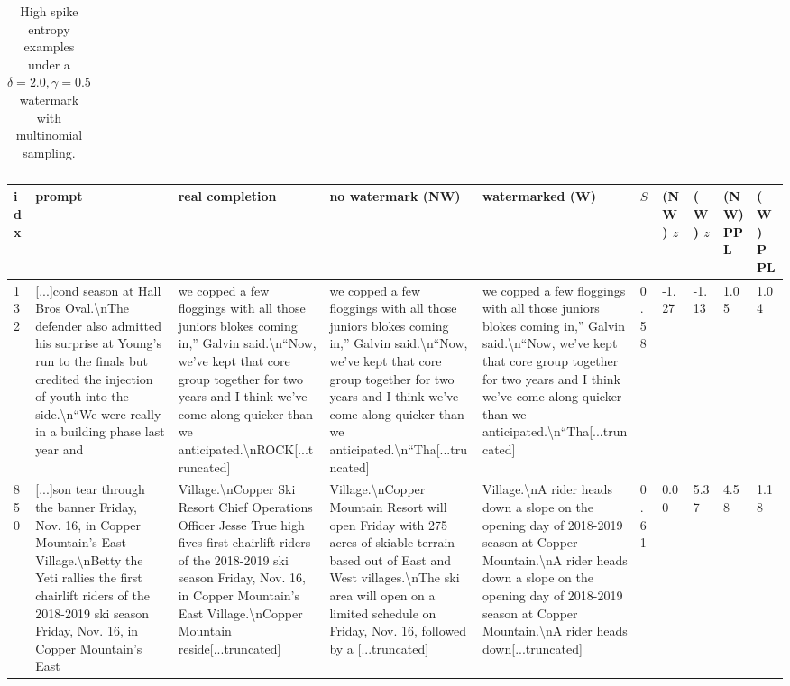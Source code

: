 \documentclass{article}
\theoremstyle{plain}
\theoremstyle{definition}
\theoremstyle{remark}
\begin{document}
\begin{table}[ht]
\begin{tabular}{p{0.2cm}|p{2.75cm}|p{2.75cm}|p{2.75cm}|p{2.75cm}|p{0.2cm}|p{0.42cm}|p{0.42cm}|p{0.3cm}|p{0.3cm}}
\bottomrule
\end{tabular}
\caption{High spike entropy examples under a $\delta=2.0,\gamma=0.5$ watermark with multinomial sampling.}\label{tab:high-entropy-examples}
\end{table}


\begin{table}[t]
\tiny
\begin{tabular}{p{0.2cm}|p{2.75cm}|p{2.75cm}|p{2.75cm}|p{2.75cm}|p{0.2cm}|p{0.42cm}|p{0.42cm}|p{0.3cm}|p{0.3cm}}
\toprule
 idx &  prompt & real completion &  no watermark (NW) &  watermarked (W) &  $S$ &  (NW) $z$ &  (W) $z$ &  (NW) PPL &  (W) PPL \\
\midrule
 132 & [...]cond season at Hall Bros Oval.\textbackslash nThe defender also admitted his surprise at Young’s run to the finals but credited the injection of youth into the side.\textbackslash n“We were really in a building phase last year and &  we copped a few floggings with all those juniors blokes coming in,” Galvin said.\textbackslash n“Now, we’ve kept that core group together for two years and I think we’ve come along quicker than we anticipated.\textbackslash nROCK[...truncated] &  we copped a few floggings with all those juniors blokes coming in,” Galvin said.\textbackslash n“Now, we’ve kept that core group together for two years and I think we’ve come along quicker than we anticipated.\textbackslash n“Tha[...truncated] &                            we copped a few floggings with all those juniors blokes coming in,” Galvin said.\textbackslash n“Now, we’ve kept that core group together for two years and I think we’ve come along quicker than we anticipated.\textbackslash n“Tha[...truncated] &               0.58 &          -1.27 &         -1.13 &       1.05 &      1.04 \\\midrule
 850 &  [...]son tear through the banner Friday, Nov. 16, in Copper Mountain's East Village.\textbackslash nBetty the Yeti rallies the first chairlift riders of the 2018-2019 ski season Friday, Nov. 16, in Copper Mountain's East &  Village.\textbackslash nCopper Ski Resort Chief Operations Officer Jesse True high fives first chairlift riders of the 2018-2019 ski season Friday, Nov. 16, in Copper Mountain's East Village.\textbackslash nCopper Mountain reside[...truncated] &  Village.\textbackslash nCopper Mountain Resort will open Friday with 275 acres of skiable terrain based out of East and West villages.\textbackslash nThe ski area will open on a limited schedule on Friday, Nov. 16, followed by a [...truncated] &                           Village.\textbackslash nA rider heads down a slope on the opening day of 2018-2019 season at Copper Mountain.\textbackslash nA rider heads down a slope on the opening day of 2018-2019 season at Copper Mountain.\textbackslash nA rider heads down[...truncated] &               0.61 &           0.00 &          5.37 &       4.58 &      1.18 \\\midrule

\end{tabular}
\end{table}
\end{document}

